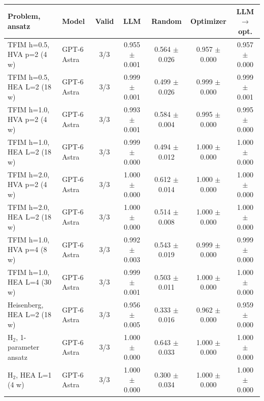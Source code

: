 \begin{tabular}{llccccc}
\toprule
Problem, ansatz & Model & Valid & LLM & Random & Optimizer & LLM$\to$opt. \\
\midrule
TFIM h=0.5, HVA p=2 (4 w) & GPT-6 Astra & 3/3 & 0.955 $\pm$ 0.001 & 0.564 $\pm$ 0.026 & 0.957 $\pm$ 0.000 & 0.957 $\pm$ 0.000 \\
TFIM h=0.5, HEA L=2 (18 w) & GPT-6 Astra & 3/3 & 0.999 $\pm$ 0.001 & 0.499 $\pm$ 0.026 & 0.999 $\pm$ 0.000 & 0.999 $\pm$ 0.001 \\
TFIM h=1.0, HVA p=2 (4 w) & GPT-6 Astra & 3/3 & 0.993 $\pm$ 0.001 & 0.584 $\pm$ 0.004 & 0.995 $\pm$ 0.000 & 0.995 $\pm$ 0.000 \\
TFIM h=1.0, HEA L=2 (18 w) & GPT-6 Astra & 3/3 & 0.999 $\pm$ 0.000 & 0.494 $\pm$ 0.012 & 1.000 $\pm$ 0.000 & 1.000 $\pm$ 0.000 \\
TFIM h=2.0, HVA p=2 (4 w) & GPT-6 Astra & 3/3 & 1.000 $\pm$ 0.000 & 0.612 $\pm$ 0.014 & 1.000 $\pm$ 0.000 & 1.000 $\pm$ 0.000 \\
TFIM h=2.0, HEA L=2 (18 w) & GPT-6 Astra & 3/3 & 1.000 $\pm$ 0.000 & 0.514 $\pm$ 0.008 & 1.000 $\pm$ 0.000 & 1.000 $\pm$ 0.000 \\
TFIM h=1.0, HVA p=4 (8 w) & GPT-6 Astra & 3/3 & 0.992 $\pm$ 0.003 & 0.543 $\pm$ 0.019 & 0.999 $\pm$ 0.000 & 0.999 $\pm$ 0.000 \\
TFIM h=1.0, HEA L=4 (30 w) & GPT-6 Astra & 3/3 & 0.999 $\pm$ 0.001 & 0.503 $\pm$ 0.011 & 1.000 $\pm$ 0.000 & 1.000 $\pm$ 0.000 \\
Heisenberg, HEA L=2 (18 w) & GPT-6 Astra & 3/3 & 0.956 $\pm$ 0.005 & 0.333 $\pm$ 0.016 & 0.962 $\pm$ 0.000 & 0.959 $\pm$ 0.000 \\
H$_2$, 1-parameter ansatz & GPT-6 Astra & 3/3 & 1.000 $\pm$ 0.000 & 0.643 $\pm$ 0.033 & 1.000 $\pm$ 0.000 & 1.000 $\pm$ 0.000 \\
H$_2$, HEA L=1 (4 w) & GPT-6 Astra & 3/3 & 1.000 $\pm$ 0.000 & 0.300 $\pm$ 0.034 & 1.000 $\pm$ 0.000 & 1.000 $\pm$ 0.000 \\
\bottomrule
\end{tabular}
